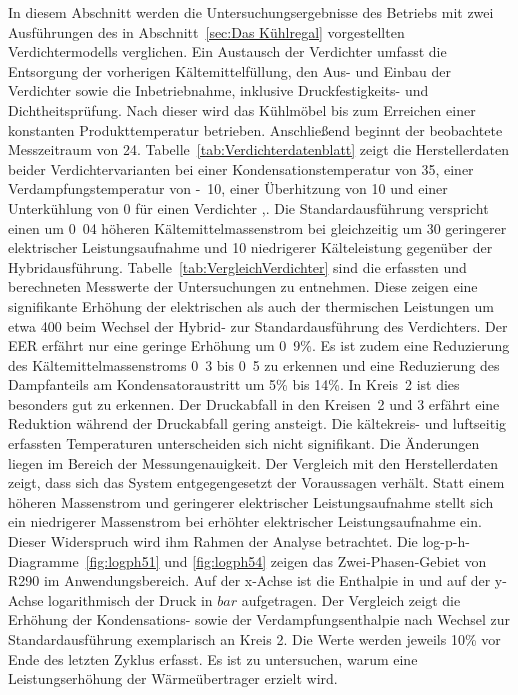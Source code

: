 In diesem Abschnitt werden die Untersuchungsergebnisse des Betriebs mit zwei Ausführungen des in Abschnitt~\ref{sec:Das Kühlregal} vorgestellten Verdichtermodells verglichen. 
Ein Austausch der Verdichter umfasst die Entsorgung der vorherigen Kältemittelfüllung, den Aus- und Einbau der Verdichter sowie die Inbetriebnahme, inklusive Druckfestigkeits- und Dichtheitsprüfung. Nach dieser wird das Kühlmöbel bis zum Erreichen einer konstanten Produkttemperatur betrieben. Anschließend beginnt der beobachtete Messzeitraum von \unit{24}{\hour}. \newline
Tabelle~\ref{tab:Verdichterdatenblatt} zeigt die Herstellerdaten beider Verdichtervarianten bei einer Kondensationstemperatur von \unit{35}{\celsius}, einer Verdampfungstemperatur von \unit{-10}{\celsius}, einer Überhitzung von \unit{10}{\kelvin} und einer Unterkühlung von \unit{0}{\kelvin} für einen Verdichter \cite{EmersonClimateTechnologies.},\cite{EmersonClimateTechnologies.2018}. Die Standardausführung verspricht einen um \unit{0.04}{\gram\per\second} höheren Kältemittelmassenstrom bei gleichzeitig um \unit{30}{\watt} geringerer elektrischer Leistungsaufnahme und \unit{10}{\watt} niedrigerer Kälteleistung gegenüber der Hybridausführung.  \newline
Tabelle~\ref{tab:VergleichVerdichter} sind die erfassten und berechneten Messwerte der Untersuchungen zu entnehmen. Diese zeigen eine signifikante Erhöhung der elektrischen als auch der thermischen Leistungen um etwa \unit{400}{\watt} beim Wechsel der Hybrid- zur Standardausführung des Verdichters. Der EER erfährt nur eine geringe Erhöhung um \unit{0.9}{\%}. Es ist zudem eine Reduzierung des Kältemittelmassenstroms \unit{0.3}{\gram\per\second} bis \unit{0.5}{\gram\per\second} zu erkennen und eine Reduzierung des Dampfanteils am Kondensatoraustritt um \unit{5}{\%} bis \unit{14}{\%}. In Kreis~2 ist dies besonders gut zu erkennen. Der Druckabfall in den Kreisen~2 und 3 erfährt eine Reduktion während der Druckabfall gering ansteigt. Die kältekreis- und luftseitig erfassten Temperaturen unterscheiden sich nicht signifikant. Die Änderungen liegen im Bereich der Messungenauigkeit. Der Vergleich mit den Herstellerdaten zeigt, dass sich das System entgegengesetzt der Voraussagen verhält. Statt einem höheren Massenstrom und geringerer elektrischer Leistungsaufnahme stellt sich ein niedrigerer Massenstrom bei erhöhter elektrischer Leistungsaufnahme ein. Dieser Widerspruch wird ihm Rahmen der Analyse betrachtet.\newline
Die log-p-h-Diagramme~\ref{fig:logph51} und \ref{fig:logph54} zeigen das Zwei-Phasen-Gebiet von R290 im Anwendungsbereich. Auf der x-Achse ist die Enthalpie in \unit{}{\kilo\joule\per\kilo\gram} und auf der y-Achse logarithmisch der Druck in $bar$ aufgetragen. Der Vergleich zeigt die Erhöhung der Kondensations- sowie der Verdampfungsenthalpie nach Wechsel zur Standardausführung exemplarisch an Kreis 2. Die Werte werden jeweils \unit{10}{\%} vor Ende des letzten Zyklus erfasst. Es ist zu untersuchen, warum eine Leistungserhöhung der Wärmeübertrager erzielt wird. \newline
